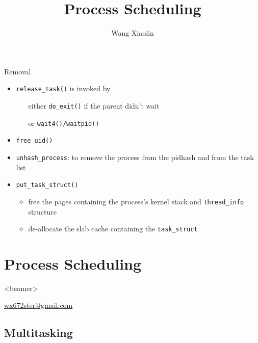 \begin{frame}
  \begin{block}{Removal}
    \begin{itemize}
    \item \texttt{release\_task()} is invoked by
      \begin{itemize}
      \item[either] \texttt{do\_exit()} if the parent didn't wait
      \item[or] \texttt{wait4()/waitpid()}
      \end{itemize}
    \item \texttt{free\_uid()}
    \item \texttt{unhash\_process}: to remove the process from the pidhash and from the task
      list
    \item \texttt{put\_task\_struct()}
      \begin{itemize}
      \item free the pages containing the process's kernel stack and \texttt{thread\_info}
        structure
      \item de-allocate the slab cache containing the \texttt{task\_struct}
      \end{itemize}
    \end{itemize}
  \end{block}
\end{frame}


\section{Process Scheduling}

\begin{frame}<beamer>
  \title{Process Scheduling}
  \author{Wang Xiaolin}
  \titlepage
  \vfill
  {\small{} \url{wx672ster@gmail.com} }
\end{frame}

\subsection{Multitasking}

